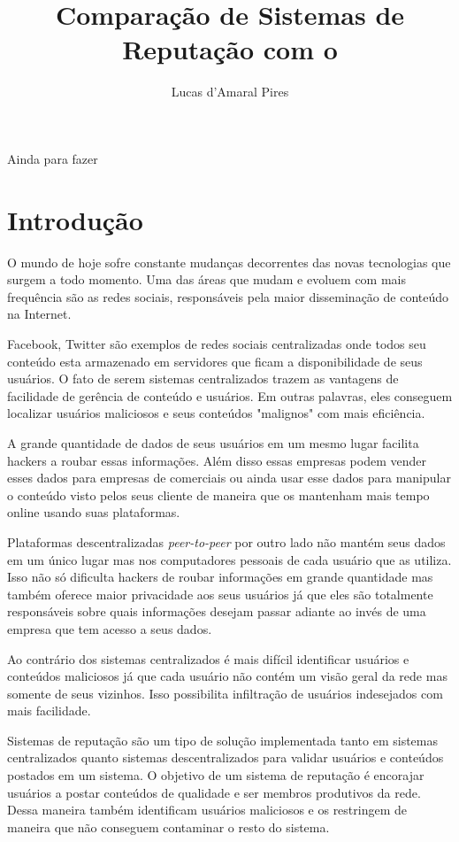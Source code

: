\documentclass[12pt]{article}
\title{Comparação de Sistemas de Reputação com o \FC}
\author{Lucas d'Amaral Pires\inst{1}}
\newcommand{\PtoP} {\emph{peer-to-peer}\xspace}
\begin{document}
 

\maketitle

\begin{resumo} 
  Ainda para fazer
  
\end{resumo}


\section{Introdução} \label{sec:intro}

O mundo de hoje sofre constante mudanças decorrentes das novas tecnologias que surgem a todo momento. Uma das áreas que mudam e evoluem com mais frequência são as redes sociais, responsáveis pela maior disseminação de conteúdo na Internet.

Facebook, Twitter são exemplos de redes sociais centralizadas onde todos seu conteúdo esta armazenado em servidores que ficam a disponibilidade de seus usuários. O fato de serem sistemas centralizados trazem as vantagens de facilidade de gerência de conteúdo e usuários. Em outras palavras, eles conseguem localizar usuários maliciosos e seus conteúdos "malignos" com mais eficiência.

A grande quantidade de dados de seus usuários em um mesmo lugar facilita hackers a roubar essas informações. Além disso essas empresas podem vender esses dados para empresas de comerciais ou ainda usar esse dados para manipular o conteúdo visto pelos seus cliente de maneira que os mantenham mais tempo online usando suas plataformas.

Plataformas descentralizadas \PtoP por outro lado não mantém seus dados em um único lugar mas nos computadores pessoais de cada usuário que as utiliza. Isso não só dificulta hackers de roubar informações em grande quantidade mas também oferece maior privacidade aos seus usuários já que eles são totalmente responsáveis sobre quais informações desejam passar adiante ao invés de uma empresa que tem acesso a seus dados.

Ao contrário dos sistemas centralizados é mais difícil identificar usuários e conteúdos maliciosos já que cada usuário não contém um visão geral da rede mas somente de seus vizinhos. Isso possibilita  infiltração de usuários indesejados com mais facilidade. 

Sistemas de reputação são um tipo de solução implementada tanto em sistemas centralizados quanto sistemas descentralizados para validar usuários e conteúdos postados em um sistema. O objetivo de um sistema de reputação é encorajar usuários a postar conteúdos de qualidade e ser membros produtivos da rede. Dessa maneira também identificam usuários maliciosos e os restringem de maneira que não conseguem contaminar o resto do sistema.
\end{document}
